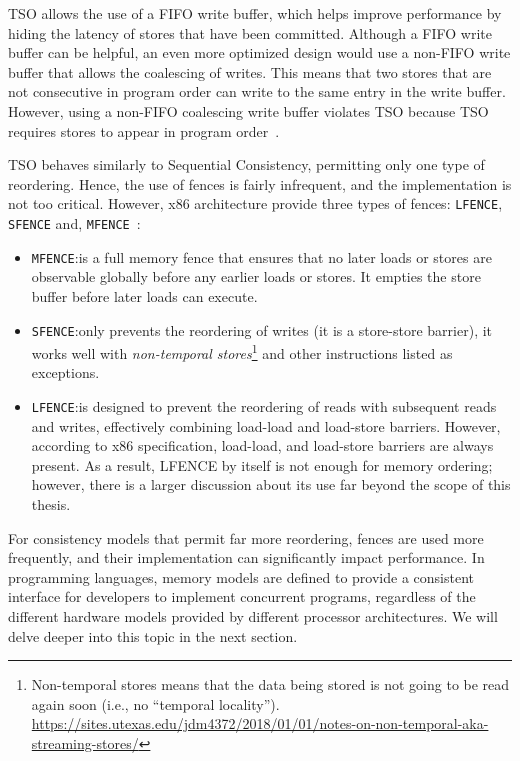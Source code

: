 TSO allows the use of a FIFO write buffer, which helps improve performance by hiding the latency of stores that have been committed. Although a FIFO write buffer can be helpful, an even more optimized design would use a non-FIFO write buffer that allows the coalescing of writes. This means that two stores that are not consecutive in program order can write to the same entry in the write buffer. However, using a non-FIFO coalescing write buffer violates TSO because TSO requires stores to appear in program order~\cite{DBLP_series_synthesis_2020Nagarajan}.

TSO behaves similarly to Sequential Consistency, permitting only one type of reordering. Hence, the use of fences is fairly infrequent, and the implementation is not too critical. However, x86 architecture provide three types of fences: \texttt{LFENCE}, \texttt{SFENCE} and, \texttt{MFENCE}~\cite{devices_amd64,guideintel}:

\begin{itemize}
  \item \texttt{MFENCE}:\@ is a full memory fence that ensures that no later loads or stores are observable globally before any earlier loads or stores. It empties the store buffer before later loads can execute.
  \item \texttt{SFENCE}:\@ only prevents the reordering of writes (it is a store-store barrier), it works well with \textit{non-temporal stores}\footnote{Non-temporal stores means that the data being stored is not going to be read again soon (i.e., no ``temporal locality'').  \url{https://sites.utexas.edu/jdm4372/2018/01/01/notes-on-non-temporal-aka-streaming-stores/}} and other instructions listed as exceptions.
  \item \texttt{LFENCE}:\@ is designed to prevent the reordering of reads with subsequent reads and writes, effectively combining load-load and load-store barriers. However, according to x86 specification, load-load, and load-store barriers are always present. As a result, LFENCE by itself is not enough for memory ordering; however, there is a larger discussion about its use far beyond the scope of this thesis.
\end{itemize}

For consistency models that permit far more reordering, fences are used more frequently, and their implementation can significantly impact performance. In programming languages, memory models are defined to provide a consistent interface for developers to implement concurrent programs, regardless of the different hardware models provided by different processor architectures. We will delve deeper into this topic in the next section.

